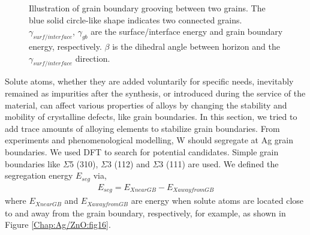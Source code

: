 \begingroup
\begin{figure}[!ht]
  \centering
  \caption[Illustration of grain boundary grooving between two grains.]{Illustration of grain boundary grooving between two grains. The blue solid circle-like shape indicates two connected grains. $\gamma_{surf/interface}$, $\gamma_{gb}$ are the surface/interface energy and grain boundary energy, respectively. $\beta$ is the dihedral angle between horizon and the  $\gamma_{surf/interface}$ direction.}
  \label{Chap:Ag/ZnO:fig15}
\end{figure}
\endgroup


Solute atoms, whether they are added voluntarily for specific needs, inevitably remained as impurities after the synthesis, or introduced during the service of the material, can affect various properties of alloys by changing the stability and mobility of crystalline defects, like grain boundaries. In this section, we tried to add trace amounts of alloying elements to stabilize grain boundaries. From experiments and phenomenological modelling, W should segregate at Ag grain boundaries\cite{chookajorn2012design,jiao2018nanocrystalline}. We used \ac{DFT} to search for potential candidates. Simple grain boundaries like $\Sigma$5 (310), $\Sigma$3 (112) and $\Sigma$3 (111) are used. We defined the segregation energy $E_{seg}$ via,
\begin{align}
E_{seg} = E_{X near GB} - E_{X away from GB}
 \label{Chap:Ag/ZnO:eq:gb_seg}
\end{align}
where $E_{X near GB}$ and $E_{X away from GB}$ are energy when solute atoms are located close to and away from the grain boundary, respectively, for example, as shown in Figure \ref{Chap:Ag/ZnO:fig16}.


